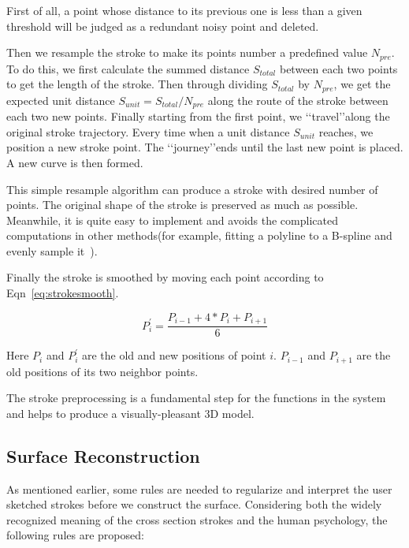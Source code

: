 First of all, a point whose distance to its previous one is less than a given threshold will be judged as a redundant noisy point and deleted.

Then we resample the stroke to make its points number a predefined value $N_{pre}$. To do this, we first calculate the summed distance $S_{total}$ between each two points to get the length of the stroke. Then through dividing $S_{total}$ by $N_{pre}$, we get the expected unit distance $S_{unit}=S_{total} / N_{pre}$ along the route of the stroke between each two new points. Finally starting from the first point, we \lq\lq{travel}\rq\rq along the original stroke trajectory. Every time when a unit distance $S_{unit}$ reaches, we position a new stroke point. The \lq\lq{journey}\rq\rq ends until the last new point is placed. A new curve is then formed.

This simple resample algorithm can produce a stroke with desired number of points. The original shape of the stroke is preserved as much as possible. Meanwhile, it is quite easy to implement and avoids the complicated computations in other methods(for example, fitting a polyline to a B-spline and evenly sample it~\cite{CMZHB99}).

Finally the stroke is smoothed by moving each point according to Eqn~\ref{eq:strokesmooth}.

\begin{equation}
\label{eq:strokesmooth}
	P_i^\prime = \frac{P_{i-1}+4*P_i+P_{i+1}}{6}
\end{equation}

Here $P_i$ and $P_i^\prime$ are the old and new positions of point $i$. $P_{i-1}$ and $P_{i+1}$ are the old positions of its two neighbor points.

The stroke preprocessing is a fundamental step for the functions in the system and helps to produce a visually-pleasant 3D model.


\subsection{Surface Reconstruction}\label{ch3:sec:alg:creation}

As mentioned earlier, some rules are needed to regularize and interpret the user sketched strokes before we construct the surface. Considering both the widely recognized meaning of the cross section strokes and the human psychology, the following rules are proposed:

